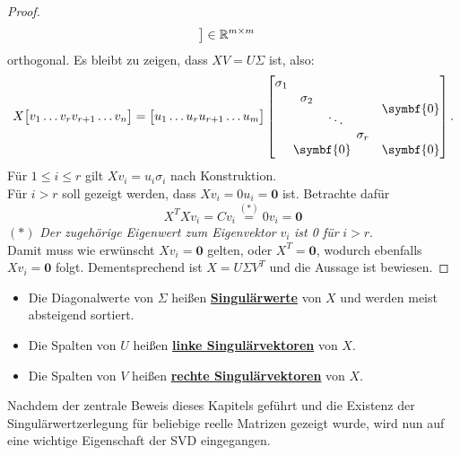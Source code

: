 \begin{proof}
\begin{equation*}
\begin{matrix}
        \end{matrix}
        \big]
        \in \mathbb{R}^{m \times m}
    \end{equation*}
    orthogonal.   
    Es bleibt zu  zeigen, dass \(XV = U\Sigma\) ist, also:
    \begin{equation*}
        X
        \big[
        \begin{matrix}
            v_1 \dots v_{r}v_{r+1} \dots v_n
        \end{matrix}
        \big]
        =
        \big[
        \begin{matrix}
            u_1 \dots u_{r}u_{r+1} \dots u_m
        \end{matrix}
        \big]
        \begin{bmatrix}
            \begin{matrix}
                \sigma_1 &  &  &  \\
                & \sigma_2 &  & \\
                &  &  \raisebox{-0.9ex}{\rotatebox{13}{\(\ddots\)}} &  \\
                &  &  & \sigma_r
            \end{matrix} & \symbf{0} \\
            \symbf{0} & \symbf{0}
        \end{bmatrix}.
    \end{equation*}
    Für \(1 \leq i \leq r\) gilt \(Xv_i = u_i \sigma_i\) nach Konstruktion. \\
    Für \(i > r\) soll gezeigt werden, dass \(Xv_i = 0u_i  = \symbf{0}\) ist. 
    Betrachte dafür
    \begin{equation*}
        X^{T}Xv_i = Cv_i \overset{(*)}{=} 0v_i = \symbf{0}
    \end{equation*}
    {\small\((*)\) \textit{Der zugehörige Eigenwert zum Eigenvektor} \(v_i\) \textit{ist \num{0} für} \(i>r\).} 
    \vspace{5pt}
    \\
    Damit muss wie erwünscht \(Xv_i = \symbf{0}\) gelten, oder \(X^{T} = \symbf{0}\), wodurch ebenfalls \(Xv_i = \symbf{0}\) folgt.       
    Dementsprechend ist \(X = U \Sigma V^{T}\) und die Aussage ist bewiesen. 
\end{proof}
\begin{remark}\leavevmode
    \vspace{-14pt}
    \begin{itemize}
        \item Die Diagonalwerte von \(\Sigma\) heißen \textbf{\underline{Singulärwerte}} von \(X\) und werden meist absteigend sortiert. 
        \item Die Spalten von \(U\) heißen \textbf{\underline{linke Singulärvektoren}} von \(X\).
        \item Die Spalten von \(V\) heißen \textbf{\underline{rechte Singulärvektoren}} von \(X\). 
    \end{itemize}       
\end{remark}
Nachdem der zentrale Beweis dieses Kapitels geführt und die Existenz der Singulärwertzerlegung für beliebige reelle Matrizen gezeigt wurde, wird nun auf eine wichtige Eigenschaft der SVD eingegangen.

